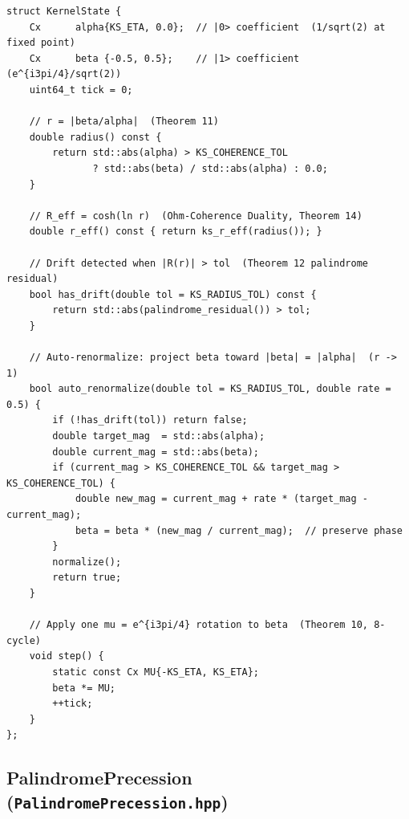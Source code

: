 \documentclass[12pt,a4paper]{article}
\theoremstyle{plain}
\theoremstyle{definition}
\theoremstyle{remark}
\begin{document}
\begin{lstlisting}[caption={KernelState: invariant monitoring and auto-renormalization.},
                   label={lst:kernelstate}]
struct KernelState {
    Cx      alpha{KS_ETA, 0.0};  // |0> coefficient  (1/sqrt(2) at fixed point)
    Cx      beta {-0.5, 0.5};    // |1> coefficient  (e^{i3pi/4}/sqrt(2))
    uint64_t tick = 0;

    // r = |beta/alpha|  (Theorem 11)
    double radius() const {
        return std::abs(alpha) > KS_COHERENCE_TOL
               ? std::abs(beta) / std::abs(alpha) : 0.0;
    }

    // R_eff = cosh(ln r)  (Ohm-Coherence Duality, Theorem 14)
    double r_eff() const { return ks_r_eff(radius()); }

    // Drift detected when |R(r)| > tol  (Theorem 12 palindrome residual)
    bool has_drift(double tol = KS_RADIUS_TOL) const {
        return std::abs(palindrome_residual()) > tol;
    }

    // Auto-renormalize: project beta toward |beta| = |alpha|  (r -> 1)
    bool auto_renormalize(double tol = KS_RADIUS_TOL, double rate = 0.5) {
        if (!has_drift(tol)) return false;
        double target_mag  = std::abs(alpha);
        double current_mag = std::abs(beta);
        if (current_mag > KS_COHERENCE_TOL && target_mag > KS_COHERENCE_TOL) {
            double new_mag = current_mag + rate * (target_mag - current_mag);
            beta = beta * (new_mag / current_mag);  // preserve phase
        }
        normalize();
        return true;
    }

    // Apply one mu = e^{i3pi/4} rotation to beta  (Theorem 10, 8-cycle)
    void step() {
        static const Cx MU{-KS_ETA, KS_ETA};
        beta *= MU;
        ++tick;
    }
};
\end{lstlisting}

\subsection{PalindromePrecession (\texttt{PalindromePrecession.hpp})}
\label{app:precession}
\end{document}
